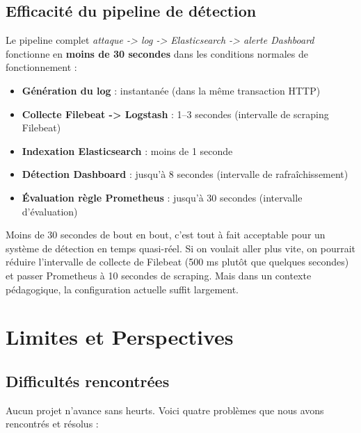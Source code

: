 \documentclass[12pt, a4paper]{report}
\begin{document}
\subsection{Efficacité du pipeline de détection}

Le pipeline complet \textit{attaque -> log -> Elasticsearch -> alerte Dashboard} fonctionne en \textbf{moins de 30 secondes} dans les conditions normales de fonctionnement :

\begin{itemize}[leftmargin=*]
  \item \textbf{Génération du log} : instantanée (dans la même transaction HTTP)
  \item \textbf{Collecte Filebeat -> Logstash} : 1--3 secondes (intervalle de scraping Filebeat)
  \item \textbf{Indexation Elasticsearch} : moins de 1 seconde
  \item \textbf{Détection Dashboard} : jusqu'à 8 secondes (intervalle de rafraîchissement)
  \item \textbf{Évaluation règle Prometheus} : jusqu'à 30 secondes (intervalle d'évaluation)
\end{itemize}

Moins de 30 secondes de bout en bout, c'est tout à fait acceptable pour un système de détection en temps quasi-réel. Si on voulait aller plus vite, on pourrait réduire l'intervalle de collecte de Filebeat (500 ms plutôt que quelques secondes) et passer Prometheus à 10 secondes de scraping. Mais dans un contexte pédagogique, la configuration actuelle suffit largement.

\section{Limites et Perspectives}

\subsection{Difficultés rencontrées}

Aucun projet n'avance sans heurts. Voici quatre problèmes que nous avons rencontrés et résolus :
\end{document}
